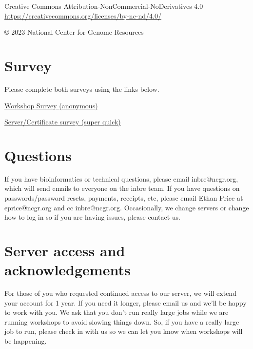 \documentclass[
]{book}
\begin{document}
Creative Commons Attribution-NonCommercial-NoDerivatives 4.0
\url{https://creativecommons.org/licenses/by-nc-nd/4.0/}

© 2023 National Center for Genome Resources

\hypertarget{survey}{%
\section*{Survey}\label{survey}}

Please complete both surveys using the links below.

\href{https://docs.google.com/forms/d/e/1FAIpQLScjtEvK-ywP9DEbTNsIcIn4YMe9evXvhmp-NVzn-t4MSakXig/viewform?usp=sf_link}{Workshop Survey (anonymous)}

\href{https://docs.google.com/forms/d/e/1FAIpQLSfGZwX2BL_ZyGgmvh4v41Q_886y-OiTESTbpvzoyR0J3BxC5Q/viewform?usp=sf_link}{Server/Certificate survey (super quick)}

\hypertarget{questions}{%
\section*{Questions}\label{questions}}

If you have bioinformatics or technical questions, please email inbre@ncgr.org, which will send emails to everyone on the inbre team. If you have questions on passwords/password resets, payments, receipts, etc, please email Ethan Price at eprice@ncgr.org and cc inbre@ncgr.org. Occasionally, we change servers or change how to log in so if you are having issues, please contact us.

\hypertarget{server-access-and-acknowledgements}{%
\section*{Server access and acknowledgements}\label{server-access-and-acknowledgements}}

For those of you who requested continued access to our server, we will extend your account for 1 year. If you need it longer, please email us and we'll be happy to work with you. We ask that you don't run really large jobs while we are running workshops to avoid slowing things down. So, if you have a really large job to run, please check in with us so we can let you know when workshops will be happening.
\end{document}

